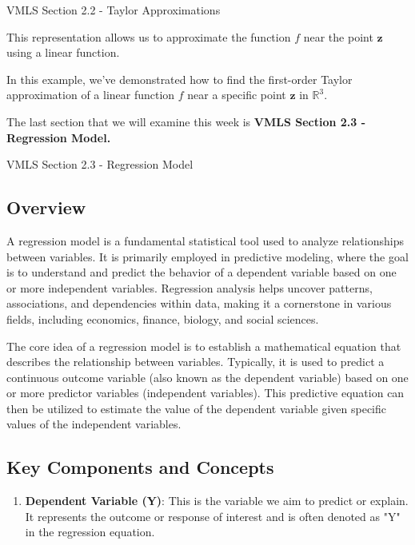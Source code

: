 \begin{notes}{VMLS Section 2.2 - Taylor Approximations}
\begin{highlight}
        This representation allows us to approximate the function \(f\) near the point \(\mathbf{z}\) using a linear function.

        
        In this example, we've demonstrated how to find the first-order Taylor approximation of a linear function \(f\) near a specific point \(\mathbf{z}\) in \(\mathbb{R}^3\).
    \end{highlight}
\end{notes}

The last section that we will examine this week is \textbf{VMLS Section 2.3 - Regression Model.}

\begin{notes}{VMLS Section 2.3 - Regression Model}
    \subsection*{Overview}

    A regression model is a fundamental statistical tool used to analyze relationships between variables. It is primarily employed in predictive modeling, where the goal is to understand and predict the behavior of a dependent variable based on 
    one or more independent variables. Regression analysis helps uncover patterns, associations, and dependencies within data, making it a cornerstone in various fields, including economics, finance, biology, and social sciences.
    
    The core idea of a regression model is to establish a mathematical equation that describes the relationship between variables. Typically, it is used to predict a continuous outcome variable (also known as the dependent variable) based on one 
    or more predictor variables (independent variables). This predictive equation can then be utilized to estimate the value of the dependent variable given specific values of the independent variables.
    
    \subsection*{Key Components and Concepts}
    
    \begin{enumerate}
        \item \textbf{Dependent Variable (Y)}: This is the variable we aim to predict or explain. It represents the outcome or response of interest and is often denoted as "Y" in the regression equation.
        

\end{enumerate}
\end{notes}

